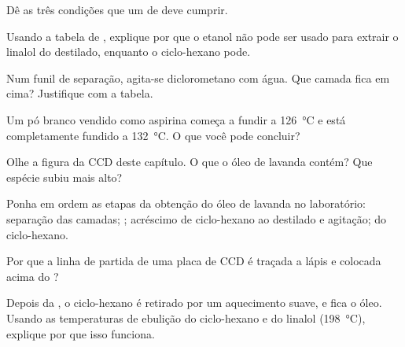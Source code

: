 \begin{exercise}[$\star$]\label{exo:g10:chemical-species:5}
Dê as três condições que um  de  deve cumprir.
\end{exercise}

\begin{exercise}[$\star\star$]\label{exo:g10:chemical-species:6}
Usando a tabela de , explique por que o etanol não pode ser
usado para extrair o linalol do destilado, enquanto o ciclo-hexano pode.
\end{exercise}

\begin{exercise}[$\star\star$]\label{exo:g10:chemical-species:7}
Num funil de separação, agita-se diclorometano com água. Que camada
fica em cima? Justifique com a tabela.
\end{exercise}

\begin{exercise}[$\star\star$]\label{exo:g10:chemical-species:8}
Um pó branco vendido como aspirina começa a fundir a \qty{126}{\celsius}
e está completamente fundido a \qty{132}{\celsius}. O que você pode
concluir?
\end{exercise}

\begin{exercise}[$\star\star$]\label{exo:g10:chemical-species:9}
Olhe a figura da CCD deste capítulo. O que o óleo de lavanda contém?
Que espécie subiu mais alto?
\end{exercise}

\begin{exercise}[$\star\star$]\label{exo:g10:chemical-species:10}
Ponha em ordem as etapas da obtenção do óleo de lavanda no laboratório:
separação das camadas; ; acréscimo de ciclo-hexano ao
destilado e agitação;  do ciclo-hexano.
\end{exercise}

\begin{exercise}[$\star\star$]\label{exo:g10:chemical-species:11}
Por que a linha de partida de uma placa de CCD é traçada a lápis e
colocada acima do ?
\end{exercise}

\begin{exercise}[$\star\star\star$]\label{exo:g10:chemical-species:12}
Depois da , o ciclo-hexano é retirado por um aquecimento suave,
e fica o óleo. Usando as temperaturas de ebulição do ciclo-hexano e do
linalol (\qty{198}{\celsius}), explique por que isso funciona.
\end{exercise}

